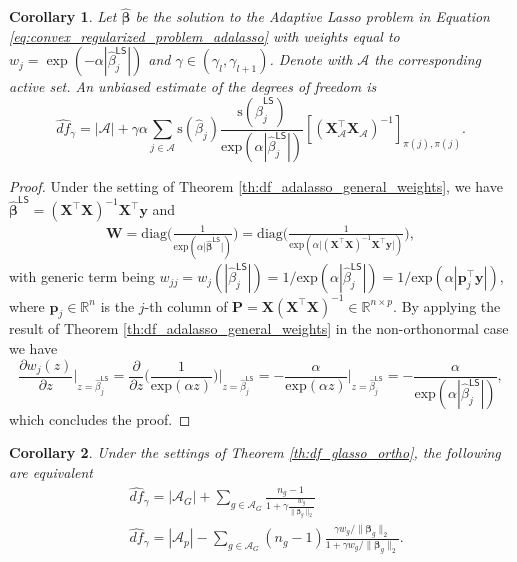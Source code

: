 \documentclass[a4paper, 12pt]{article}
\newcommand{\Aset}{\mathcal{A}}
\newcommand{\sgn}{\mathrm{s}}
\newcommand{\eexp}{\mathrm{exp}}
\newcommand{\betahat}{\widehat{\boldsymbol\beta}}
\newcommand{\T}{\top}
\def\bbeta{\boldsymbol{\beta}}
\def\bp{\boldsymbol{p}}
\def\by{\boldsymbol{y}}
\def\bP{\mathbf{P}}
\def\bW{\mathbf{W}}
\def\bX{\mathbf{X}}
\def\bp{\mathbf{p}}
\def\by{\mathbf{y}}
\newtheorem{corollary}{Corollary}
\begin{document}
%
\begin{corollary}
\label{coro:df_adalasso_nonortho_exp}
Let $\betahat$ be the solution to the Adaptive Lasso problem in Equation \eqref{eq:convex_regularized_problem_adalasso} with weights equal to $w_j = \exp(-\alpha|\widehat{\beta}_j^{\mathsf{LS}}|)$ and $\gamma \in (\gamma_l, \gamma_{l+1})$. Denote with $\Aset$ the corresponding active set. An unbiased estimate of the degrees of freedom is
\begin{equation*} 
\label{eq:dof_adalasso_nonortho_exp}
\widehat{df}_\gamma=\vert\Aset\vert+\gamma\alpha\sum_{j\in\Aset} \sgn(\widehat{\beta}_{j}) \frac{ \sgn(\widehat{\beta}_j^{\mathsf{LS}})}{\eexp(\alpha|\widehat{\beta}_j^{\mathsf{LS}}|)} [(\bX_{\Aset}^{\T} \bX_{\Aset} )^{-1}]_{\pi(j),\pi(j)}.
\end{equation*}
\end{corollary}
\begin{proof}
Under the setting of Theorem \ref{th:df_adalasso_general_weights}, we have $\widehat{\bbeta}^{\mathsf{LS}} = (\bX^{\T}\bX)^{-1}\bX^{\T} \by$ and
\begin{equation*}
\begin{aligned}
\bW=\mathrm{diag}\Big(\frac{1}{\eexp(\alpha\vert\betahat^{\mathsf{LS}}\vert)}\Big)=\mathrm{diag}\Big(\frac{1}{\eexp(\alpha\vert(\bX^{\T}\bX)^{-1}\bX^{\T}\by\vert)}\Big),
\end{aligned}
\end{equation*}
with generic term being $w_{jj} = w_j(|\widehat{\beta}_j^\mathsf{LS}|) = 1/\eexp(\alpha|\widehat{\beta}^{\mathsf{LS}}_j|) =1/\eexp(\alpha|\bp_j^{\T} \by|)$, where $\bp_j\in\mathbb{R}^n$ is the $j$-th column of $\bP=\bX(\bX^{\T}\bX)^{-1}\in\mathbb{R}^{n\times p}$. By applying the result of Theorem \ref{th:df_adalasso_general_weights} in the non-orthonormal case we have
\begin{equation*}
\frac{\partial w_j(z)}{\partial z} \bigg|_{z=\widehat{\beta}_j^\mathsf{LS}} = \frac{\partial}{\partial z} \bigg( \frac{1}{\eexp(\alpha z)}\bigg)\bigg|_{z=\widehat{\beta}_j^\mathsf{LS}} =  - \frac{\alpha}{\eexp(\alpha z)}\bigg|_{z=\widehat{\beta}_j^\mathsf{LS}} =  - \frac{\alpha}{\eexp(\alpha|\widehat{\beta}_j^\mathsf{LS}|)},
\end{equation*}
which concludes the proof.
\end{proof}
%
\begin{corollary}
\label{coro:similarexpressions}
Under the settings of Theorem \ref{th:df_glasso_ortho}, the following are equivalent 
\begin{align*}
\label{eq:dof_glasso_ortho_simple}
&\widehat{df}_\gamma = |\Aset_G| + \sum_{g \in \Aset_G} \frac{n_g-1}{1+\gamma\frac{w_g}{\lVert \bbeta_g\rVert_2}}  \\
&\widehat{df}_\gamma = |\Aset_p| - \sum_{g \in \Aset_G} (n_g-1)\frac{\gamma w_g / \lVert \bbeta_g \rVert_2}{1+\gamma w_g / \lVert \bbeta_g \rVert_2}.
\end{align*}
\end{corollary}
\end{document}
